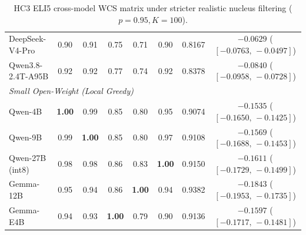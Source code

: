 \documentclass[11pt]{article}
\begin{document}
\begin{table}[t]
{\begin{tabular}{lccccccc}
DeepSeek-V4-Pro & 0.90 & 0.91 & 0.75 & 0.71 & 0.90 & 0.8167 & $-0.0629$ ($[-0.0763,\,-0.0497]$) \\
Qwen3.8-2.4T-A95B & 0.92 & 0.92 & 0.77 & 0.74 & 0.92 & 0.8378 & $-0.0840$ ($[-0.0958,\,-0.0728]$) \\
\midrule
\multicolumn{7}{l}{\textit{Small Open-Weight (Local Greedy)}} \\
Qwen-4B & \textbf{1.00} & 0.99 & 0.85 & 0.80 & 0.95 & 0.9074 & $-0.1535$ ($[-0.1650,\,-0.1425]$) \\
Qwen-9B & 0.99 & \textbf{1.00} & 0.85 & 0.80 & 0.97 & 0.9108 & $-0.1569$ ($[-0.1688,\,-0.1453]$) \\
Qwen-27B (int8) & 0.98 & 0.98 & 0.86 & 0.83 & \textbf{1.00} & 0.9150 & $-0.1611$ ($[-0.1729,\,-0.1499]$) \\
Gemma-12B & 0.95 & 0.94 & 0.86 & \textbf{1.00} & 0.94 & 0.9382 & $-0.1843$ ($[-0.1953,\,-0.1735]$) \\
Gemma-E4B & 0.94 & 0.93 & \textbf{1.00} & 0.79 & 0.90 & 0.9136 & $-0.1597$ ($[-0.1717,\,-0.1481]$) \\
\bottomrule
\end{tabular}%
}
\caption{HC3 ELI5 cross-model WCS matrix under stricter realistic nucleus filtering ($p=0.95, K=100$).}
\label{tab:eli5_p95}
\end{table}
\end{document}
